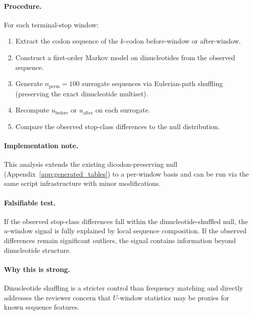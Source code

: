 \paragraph{Procedure.}
For each terminal-stop window:
\begin{enumerate}
\item Extract the codon sequence of the $k$-codon before-window or after-window.
\item Construct a first-order Markov model on dinucleotides from the observed sequence.
\item Generate $n_{\mathrm{perm}}=100$ surrogate sequences via Eulerian-path shuffling (preserving the exact dinucleotide multiset).
\item Recompute $u_{\mathrm{before}}$ or $u_{\mathrm{after}}$ on each surrogate.
\item Compare the observed stop-class differences to the null distribution.
\end{enumerate}

\paragraph{Implementation note.}
This analysis extends the existing dicodon-preserving null (Appendix~\ref{app:generated_tables}) to a per-window basis and can be run via the same script infrastructure with minor modifications.

\paragraph{Falsifiable test.}
If the observed stop-class differences fall within the dinucleotide-shuffled null, the $u$-window signal is fully explained by local sequence composition.
If the observed differences remain significant outliers, the signal contains information beyond dinucleotide structure.

\paragraph{Why this is strong.}
Dinucleotide shuffling is a stricter control than frequency matching and directly addresses the reviewer concern that $U$-window statistics may be proxies for known sequence features.

